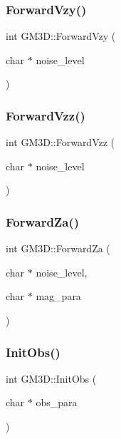 \mbox{\label{class_g_m3_d_a8eb7a4f1981bbccc1a1e6f12dc868228}} 
\subsubsection{\texorpdfstring{ForwardVzy()}{ForwardVzy()}}
{\footnotesize\ttfamily int G\+M3\+D\+::\+Forward\+Vzy (\begin{DoxyParamCaption}\item[{char $\ast$}]{noise\+\_\+level }\end{DoxyParamCaption})}

\mbox{\label{class_g_m3_d_aff475e00f0f6cadb64ecca640e406023}} 
\subsubsection{\texorpdfstring{ForwardVzz()}{ForwardVzz()}}
{\footnotesize\ttfamily int G\+M3\+D\+::\+Forward\+Vzz (\begin{DoxyParamCaption}\item[{char $\ast$}]{noise\+\_\+level }\end{DoxyParamCaption})}

\mbox{\label{class_g_m3_d_a7c8346f92a8adeeab38763a2489ce99c}} 
\subsubsection{\texorpdfstring{ForwardZa()}{ForwardZa()}}
{\footnotesize\ttfamily int G\+M3\+D\+::\+Forward\+Za (\begin{DoxyParamCaption}\item[{char $\ast$}]{noise\+\_\+level,  }\item[{char $\ast$}]{mag\+\_\+para }\end{DoxyParamCaption})}

\mbox{\label{class_g_m3_d_aaff9834c6b6c9f4c245ed954d448750e}} 
\subsubsection{\texorpdfstring{InitObs()}{InitObs()}}
{\footnotesize\ttfamily int G\+M3\+D\+::\+Init\+Obs (\begin{DoxyParamCaption}\item[{char $\ast$}]{obs\+\_\+para }\end{DoxyParamCaption})}


